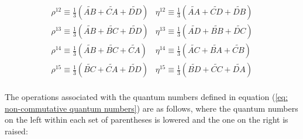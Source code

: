 \documentclass{article}
\begin{document}
\begin{equation}
\begin{array}{ll}
     \rho^{12}\equiv\frac{1}{3}( \widetilde{AB}+\widetilde{CA}+\widetilde{DD}) & \eta^{12}\equiv\frac{1}{3}( \widetilde{AA}+\widetilde{CD}+\widetilde{DB})\\
     \rho^{13}\equiv\frac{1}{3}( \widetilde{AB}+\widetilde{BC}+\widetilde{DD}) & \eta^{13}\equiv\frac{1}{3}( \widetilde{AD}+\widetilde{BB}+\widetilde{DC})\\
     \rho^{14}\equiv\frac{1}{3}( \widetilde{AB}+\widetilde{BC}+\widetilde{CA}) & \eta^{14}\equiv\frac{1}{3}( \widetilde{AC}+\widetilde{BA}+\widetilde{CB})\\
     \rho^{15}\equiv\frac{1}{3}( \widetilde{BC}+\widetilde{CA}+\widetilde{DD}) & \eta^{15}\equiv\frac{1}{3}( \widetilde{BD}+\widetilde{CC}+\widetilde{DA})\\

\end{array}
\label{eq: non-commutative quantum numbers}
\end{equation}

The operations associated with the quantum numbers defined in equation (\ref{eq: non-commutative quantum numbers}) are as follows, where the quantum numbers on the left within each set of parentheses is lowered and the one on the right is raised:
\end{document}
